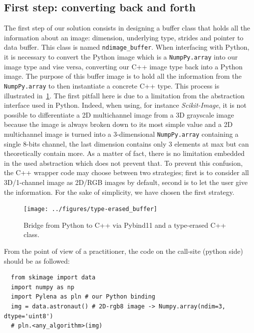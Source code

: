 \subsection{First step: converting back and forth}

The first step of our solution consists in designing a buffer class that holds all the information about an image:
dimension, underlying type, strides and pointer to data buffer. This class is named \texttt{ndimage\_buffer}. When
interfacing with Python, it is necessary to convert the Python image which is a \texttt{NumpPy.array} into our image
type and vise versa, converting our C++ image type back into a Python image. The purpose of this buffer image is to hold
all the information from the \texttt{NumpPy.array} to then instantiate a concrete C++ type. This process is illustrated
in~\cref{fig:type-erased.buffer}. The first pitfall here is due to a limitation from the abstraction interface used in
Python. Indeed, when using, for instance \emph{Scikit-Image}, it is not possible to differentiate a 2D multichannel
image from a 3D grayscale image because the image is always broken down to its most simple value and a 2D multichannel
image is turned into a 3-dimensional \texttt{NumpPy.array} containing a single 8-bits channel, the last dimension
contains only 3 elements at max but can theoretically contain more. As a matter of fact, there is no limitation embedded
in the used abstraction which does not prevent that. To prevent this confusion, the C++ wrapper code may choose between
two strategies; first is to consider all 3D/1-channel image as 2D/RGB images by default, second is to let the user give
the information. For the sake of simplicity, we have chosen the first strategy.

\begin{figure}[htbp]
  \centering
  \texttt{[image: ../figures/type-erased\_buffer]}
  \caption{Bridge from Python to C++ via Pybind11 and a type-erased C++ class.}
  \label{fig:type-erased.buffer}
\end{figure}

From the point of view of a practitioner, the code on the call-site (python side) should be as followed:
\begin{verbatim}
  from skimage import data
  import numpy as np
  import Pylena as pln # our Python binding
  img = data.astronaut() # 2D-rgb8 image -> Numpy.array(ndim=3, dtype='uint8')
  # pln.<any_algorithm>(img)
\end{verbatim}

